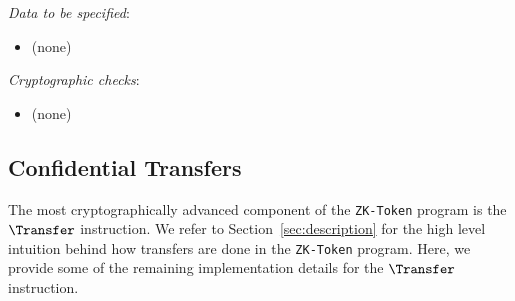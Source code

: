 \noindent
\textit{Data to be specified}:
\begin{itemize}
  \item[] (none)
\end{itemize}

\noindent
\textit{Cryptographic checks}:
\begin{itemize}
  \item[] (none)
\end{itemize}

\endgroup

\newcommand{\PedComm}{\ms{PedComm}}
\newcommand{\DecHandle}{\ms{DecHandle}}
\newcommand{\lo}{\ms{lo}}
\newcommand{\hi}{\ms{hi}}

\newpage
\subsection{Confidential Transfers}
The most cryptographically advanced component of the \texttt{ZK-Token} program
is the $\Transfer$ instruction. We refer to Section~\ref{sec:description} for the
high level intuition behind how transfers are done in the \texttt{ZK-Token}
program. Here, we provide some of the remaining implementation details for the
$\Transfer$ instruction.

